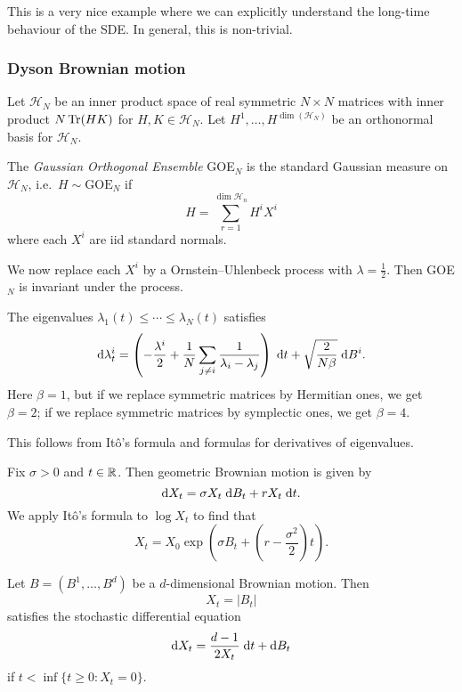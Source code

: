 \documentclass[a4paper]{article}
\begin{document}
This is a very nice example where we can explicitly understand the long-time behaviour of the SDE. In general, this is non-trivial.

\subsubsection*{Dyson Brownian motion}
Let $\mathcal{H}_N$ be an inner product space of real symmetric $N \times N$ matrices with inner product $N \operatorname{Tr}(HK)$ for $H, K \in \mathcal{H}_N$. Let $H^1, \ldots, H^{\dim(\mathcal{H}_N)}$ be an orthonormal basis for $\mathcal{H}_N$.

\begin{defi}
  The \emph{Gaussian Orthogonal Ensemble} GOE$_N$ is the standard Gaussian measure on $\mathcal{H}_N$, i.e.\ $H \sim \mathrm{GOE}_N$ if
  \[
    H = \sum_{r = 1}^{\dim \mathcal{H}_n} H^i X^i
  \]
  where each $X^i$ are iid standard normals.
\end{defi}

We now replace each $X^i$ by a Ornstein--Uhlenbeck process with $\lambda = \frac{1}{2}$. Then GOE$_N$ is invariant under the process.

\begin{thm}
  The eigenvalues $\lambda_1(t) \leq \cdots \leq \lambda_N(t)$ satisfies
  \[
    \mathrm{d} \lambda_t^i = \left(-\frac{\lambda^i}{2} + \frac{1}{N} \sum_{j \not= i} \frac{1}{\lambda_i - \lambda_j}\right)\;\mathrm{d} t + \sqrt{\frac{2}{N\beta}}\;\mathrm{d} B^i.
  \]
  Here $\beta = 1$, but if we replace symmetric matrices by Hermitian ones, we get $\beta = 2$; if we replace symmetric matrices by symplectic ones, we get $\beta = 4$.
\end{thm}
This follows from It\^o's formula and formulas for derivatives of eigenvalues.%

\begin{eg}
  Fix $\sigma > 0$ and $t \in \mathbb{R}$. Then geometric Brownian motion is given by
  \[
    \mathrm{d} X_t = \sigma X_t \;\mathrm{d} B_t + r X_t \;\mathrm{d} t.
  \]
  We apply It\^o's formula to $\log X_t$ to find that
  \[
    X_t = X_0 \exp \left(\sigma B_t + \left(r - \frac{\sigma^2}{2}\right)t\right).
  \]
\end{eg}

\begin{eg}
  Let $B = (B^1, \ldots, B^d)$ be a $d$-dimensional Brownian motion. Then
  \[
    X_t = |B_t|
  \]
  satisfies the stochastic differential equation
  \[
    \d X_t = \frac{d - 1}{2X_t} \;\d t + \d B_t %
  \]
  if $t < \inf\{t \geq 0: X_t = 0\}$.
\end{eg}
\end{document}
